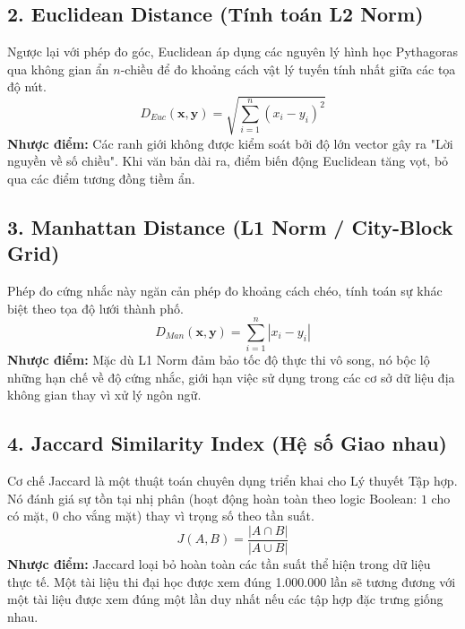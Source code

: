 \documentclass[journal]{IEEEtran}
\begin{document}
\subsection{2. Euclidean Distance (Tính toán L2 Norm)}

Ngược lại với phép đo góc, Euclidean áp dụng các nguyên lý hình học Pythagoras qua không gian ẩn $n$-chiều để đo khoảng cách vật lý tuyến tính nhất giữa các tọa độ nút.
\begin{equation}
\label{eq:euclidean_baseline}
D_{Euc}(\mathbf{x}, \mathbf{y}) = \sqrt{\sum_{i=1}^{n} (x_i - y_i)^2}
\end{equation}
\textbf{Nhược điểm:} Các ranh giới không được kiểm soát bởi độ lớn vector gây ra "Lời nguyền về số chiều". Khi văn bản dài ra, điểm biến động Euclidean tăng vọt, bỏ qua các điểm tương đồng tiềm ẩn.

\subsection{3. Manhattan Distance (L1 Norm / City-Block Grid)}

Phép đo cứng nhắc này ngăn cản phép đo khoảng cách chéo, tính toán sự khác biệt theo tọa độ lưới thành phố.
\begin{equation}
\label{eq:manhattan_baseline}
D_{Man}(\mathbf{x}, \mathbf{y}) = \sum_{i=1}^{n} |x_i - y_i|
\end{equation}
\textbf{Nhược điểm:} Mặc dù L1 Norm đảm bảo tốc độ thực thi vô song, nó bộc lộ những hạn chế về độ cứng nhắc, giới hạn việc sử dụng trong các cơ sở dữ liệu địa không gian thay vì xử lý ngôn ngữ.

\subsection{4. Jaccard Similarity Index (Hệ số Giao nhau)}

Cơ chế Jaccard là một thuật toán chuyên dụng triển khai cho Lý thuyết Tập hợp. Nó đánh giá sự tồn tại nhị phân (hoạt động hoàn toàn theo logic Boolean: $1$ cho có mặt, $0$ cho vắng mặt) thay vì trọng số theo tần suất.
\begin{equation}
\label{eq:jaccard_baseline}
J(A, B) = \frac{|A \cap B|}{|A \cup B|}
\end{equation}
\textbf{Nhược điểm:} Jaccard loại bỏ hoàn toàn các tần suất thể hiện trong dữ liệu thực tế. Một tài liệu thi đại học được xem đúng 1.000.000 lần sẽ tương đương với một tài liệu được xem đúng một lần duy nhất nếu các tập hợp đặc trưng giống nhau.
\end{document}
